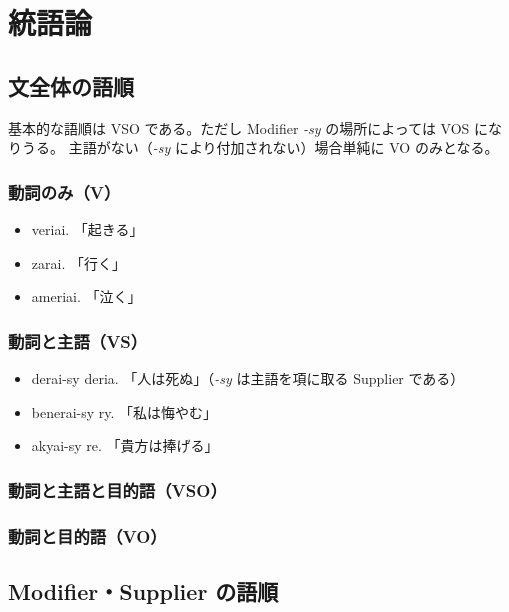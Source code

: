 \section{統語論}

\subsection{文全体の語順}

基本的な語順は VSO である。ただし Modifier \emph{-sy} の場所によっては VOS になりうる。
主語がない（\emph{-sy} により付加されない）場合単純に VO のみとなる。

\subsubsection{動詞のみ（V）}

\begin{itemize}
    \item veriai.   「起きる」
    \item zarai.    「行く」
    \item ameriai.  「泣く」
\end{itemize}

\subsubsection{動詞と主語（VS）}
\begin{itemize}
    \item derai-sy deria.   「人は死ぬ」（\emph{-sy} は主語を項に取る Supplier である）
    \item benerai-sy ry.    「私は悔やむ」
    \item akyai-sy re.      「貴方は捧げる」
\end{itemize}

\subsubsection{動詞と主語と目的語（VSO）}

\subsubsection{動詞と目的語（VO）}

\subsection{Modifier・Supplier の語順}